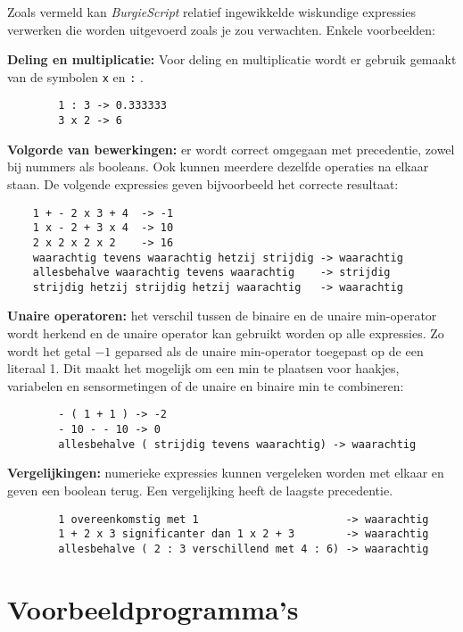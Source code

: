 \documentclass[11pt]{article}
\begin{document}
Zoals vermeld kan \textit{BurgieScript} relatief ingewikkelde wiskundige expressies verwerken die worden uitgevoerd zoals je zou verwachten. Enkele voorbeelden:
\begin{description}
    \item{\bf Deling en multiplicatie:}
        Voor deling en multiplicatie wordt er gebruik gemaakt van de symbolen \texttt{x} en \texttt{:} .
        \begin{lstlisting}
        1 : 3 -> 0.333333
        3 x 2 -> 6\end{lstlisting}
    \item{\bf Volgorde van bewerkingen:} er wordt correct omgegaan met precedentie, zowel bij nummers als booleans. Ook kunnen meerdere dezelfde operaties na elkaar staan. De volgende expressies geven bijvoorbeeld het correcte resultaat:
        \begin{lstlisting}
    1 + - 2 x 3 + 4  -> -1
    1 x - 2 + 3 x 4  -> 10
    2 x 2 x 2 x 2    -> 16
    waarachtig tevens waarachtig hetzij strijdig -> waarachtig
    allesbehalve waarachtig tevens waarachtig    -> strijdig
    strijdig hetzij strijdig hetzij waarachtig   -> waarachtig\end{lstlisting}
    \item{\bf Unaire operatoren:} het verschil tussen de binaire en de unaire min-operator wordt herkend en de unaire operator kan gebruikt worden op alle expressies. Zo wordt het getal $-1$ geparsed als de unaire min-operator toegepast op de een literaal 1. Dit maakt het mogelijk om een min te plaatsen voor haakjes, variabelen en sensormetingen of de unaire en binaire min te combineren:
        \begin{lstlisting}
        - ( 1 + 1 ) -> -2
        - 10 - - 10 -> 0
        allesbehalve ( strijdig tevens waarachtig) -> waarachtig\end{lstlisting}
    \item{\bf Vergelijkingen:} numerieke expressies kunnen vergeleken worden met elkaar en geven een boolean terug. Een vergelijking heeft de laagste precedentie.
\end{description}
        \begin{lstlisting}
        1 overeenkomstig met 1                       -> waarachtig
        1 + 2 x 3 significanter dan 1 x 2 + 3        -> waarachtig
        allesbehalve ( 2 : 3 verschillend met 4 : 6) -> waarachtig  \end{lstlisting}

\section{Voorbeeldprogramma's}
\end{document}

